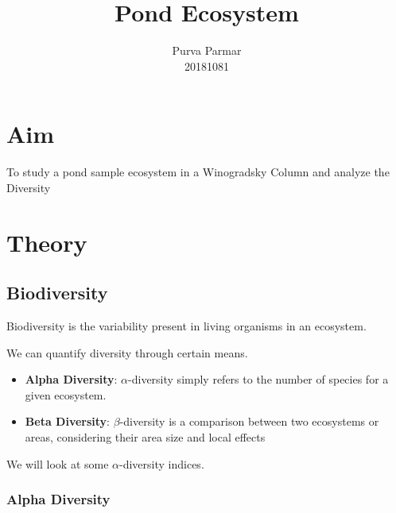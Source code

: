 \documentclass[twocolumn]{article}
\title{Pond Ecosystem}
\author{Purva Parmar \\ 20181081}
\date{}
\begin{document}
\graphicspath{{../}}
\setlength{\parindent}{0pt}
\setlength{\parskip}{\baselineskip}

\maketitle


\section{Aim}
To study a pond sample ecosystem in a Winogradsky Column and analyze the Diversity 

\section{Theory}

\subsection{Biodiversity}

Biodiversity is the variability present in living organisms in an ecosystem.

We can quantify diversity through certain means. 

\begin{itemize}
    \item \textbf{Alpha Diversity}: $\alpha$-diversity simply refers to the number of species for a given ecosystem.
    \item \textbf{Beta Diversity}: $\beta$-diversity is a comparison between two ecosystems or areas, considering their area size and local effects
\end{itemize}

We will look at some $\alpha$-diversity indices.

\subsubsection{Alpha Diversity}
\end{document}
